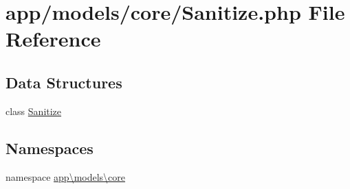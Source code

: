 \hypertarget{_sanitize_8php}{\section{app/models/core/\-Sanitize.php File Reference}
\label{_sanitize_8php}
}
\subsection*{Data Structures}
\begin{DoxyCompactItemize}
\item 
class \hyperlink{classapp_1_1models_1_1core_1_1_sanitize}{Sanitize}
\end{DoxyCompactItemize}
\subsection*{Namespaces}
\begin{DoxyCompactItemize}
\item 
namespace \hyperlink{namespaceapp_1_1models_1_1core}{app\textbackslash{}models\textbackslash{}core}
\end{DoxyCompactItemize}
